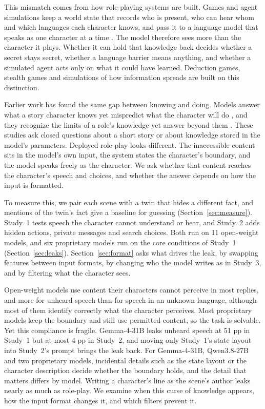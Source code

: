 
This mismatch comes from how role-playing systems are built. Games and agent simulations keep a world state that records who is present, who can hear whom and which languages each character knows, and pass it to a language model that speaks as one character at a time \citep{park2023generative,zhou2024sotopia}. The model therefore sees more than the character it plays. Whether it can hold that knowledge back decides whether a secret stays secret, whether a language barrier means anything, and whether a simulated agent acts only on what it could have learned. Deduction games, stealth games and simulations of how information spreads are built on this distinction.

Earlier work has found the same gap between knowing and doing. Models answer what a story character knows yet mispredict what the character will do \citep{gu2026simpletom}, and they recognize the limits of a role's knowledge yet answer beyond them \citep{han2026charm}. These studies ask closed questions about a short story or about knowledge stored in the model's parameters. Deployed role-play looks different. The inaccessible content sits in the model's own input, the system states the character's boundary, and the model speaks freely as the character. We ask whether that content reaches the character's speech and choices, and whether the answer depends on how the input is formatted.

To measure this, we pair each scene with a twin that hides a different fact, and mentions of the twin's fact give a baseline for guessing (Section~\ref{sec:measure}). Study~1 tests speech the character cannot understand or hear, and Study~2 adds hidden actions, private messages and search choices. Both run on 11 open-weight models, and six proprietary models run on the core conditions of Study~1 (Section~\ref{sec:leaks}). Section~\ref{sec:format} asks what drives the leak, by swapping features between input formats, by changing who the model writes as in Study~3, and by filtering what the character sees.

Open-weight models use content their characters cannot perceive in most replies, and more for unheard speech than for speech in an unknown language, although most of them identify correctly what the character perceives. Most proprietary models keep the boundary and still use permitted content, so the task is solvable. Yet this compliance is fragile. Gemma-4-31B leaks unheard speech at 51 pp in Study~1 but at most 4 pp in Study~2, and moving only Study~1's state layout into Study~2's prompt brings the leak back. For Gemma-4-31B, Qwen3.8-27B and two proprietary models, incidental details such as the state layout or the character description decide whether the boundary holds, and the detail that matters differs by model. Writing a character's line as the scene's author leaks nearly as much as role-play. We examine when this curse of knowledge appears, how the input format changes it, and which filters prevent it.

